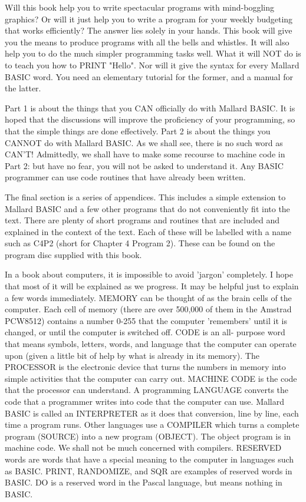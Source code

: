 \documentclass[]{report} %
\begin{document}
Will  this  book  help you to write spectacular  programs  with  mind-boggling 
graphics?  Or  will  it  just help you to write  a  program  for  your  weekly 
budgeting  that works efficiently? The answer lies solely in your hands.  This 
book  will  give  you the means to produce programs with  all  the  bells  and 
whistles. It will also help you to do the much simpler programming tasks well. 
What it will NOT do is to teach you how to PRINT "Hello". Nor will it give the 
syntax  for every Mallard BASIC word. You need an elementary tutorial for  the 
former, and a manual for the latter.

Part  1 is about the things that you CAN officially do with Mallard BASIC.  It 
is   hoped  that  the  discussions  will  improve  the  proficiency  of   your 
programming,  so that the simple things are done effectively. Part 2 is  about 
the things you CANNOT do with Mallard BASIC. As we shall see, there is no such 
word as CAN'T! Admittedly, we shall have to make some recourse to machine code 
in Part 2: but have no fear, you will not be asked to understand it. Any BASIC 
programmer can use code routines that have already been written.

The final section is a series of appendices. This includes a simple  extension 
to  Mallard BASIC and a few other programs that do not conveniently  fit  into 
the  text. There are plenty of short programs and routines that  are  included 
and explained in the context of the text. Each of these will be labelled  with 
a name such as C4P2 (short for Chapter 4 Program 2). These can be found on the 
program disc supplied with this book.

In  a book about computers, it is impossible to avoid 'jargon'  completely.  I 
hope that most of it will be explained as we progress. It may be helpful  just 
to  explain  a few words immediately. MEMORY can be thought of  as  the  brain 
cells of the computer. Each cell of memory (there are over 500,000 of them  in 
the  Amstrad  PCW8512) contains a number 0-255 that the  computer  'remembers' 
until  it is changed, or until the computer is switched off. CODE is  an  all-
purpose  word  that  means  symbols, letters, words,  and  language  that  the 
computer  can operate upon (given a little bit of help by what is  already  in 
its memory). The PROCESSOR is the electronic device that turns the numbers  in 
memory into simple activities that the computer can carry out. MACHINE CODE is 
the  code that the processor can understand. A programming  LANGUAGE  converts 
the code that a programmer writes into code that the computer can use. Mallard 
BASIC is called an INTERPRETER as it does that conversion, line by line,  each 
time  a  program runs. Other languages use a COMPILER which turns  a  complete 
program (SOURCE) into a new program (OBJECT). The object program is in machine 
code. We shall not be much concerned with compilers. RESERVED words are  words 
that have a special meaning to the computer in languages such as BASIC. PRINT, 
RANDOMIZE,  and SQR are examples of reserved words in BASIC. DO is a  reserved 
word in the Pascal language, but means nothing in BASIC.
\end{document}
